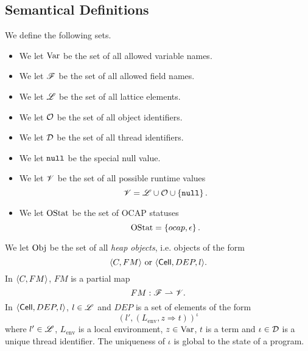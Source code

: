\subsection{Semantical Definitions}%
\label{sub:semantical_definitions}

\begin{definition}[Sets] We define the following sets.
  \begin{itemize}
    \item We let $\mathrm{Var}$ be the set of all allowed variable names.
    \item We let $\mathscr{F}$ be the set of all allowed field names.
    \item We let $\mbox{$\mathscr{L}$}$ be the set of all lattice elements.
    \item We let $\mathcal{O}$ be the set of all object identifiers.
    \item We let $\mathcal{D}$ be the set of all thread identifiers.
    \item We let $\mbox{\mdseries\texttt{null}}$ be the special null value.
    \item We let $\mathscr{V}$ be the set of all possible runtime values
      \begin{equation*}
        \mathscr{V} = \mbox{$\mathscr{L}$} \cup \mathcal{O} \cup \left\{ \mbox{\mdseries\texttt{null}} \right\}.
      \end{equation*}
    \item We let $\mathrm{OStat}$ be the set of OCAP statuses
      \begin{equation*}
        \mathrm{OStat} = \left\{ \mbox{$ocap$}, \mbox{$\epsilon$} \right\}.
      \end{equation*}
  \end{itemize}
\end{definition}

\begin{definition}\label{def:heap_obj}
  We let $\mathrm{Obj}$ be the set of all \emph{heap objects}, i.e. objects of the
  form
  \begin{equation*}
    \mbox{$\langle C, FM \rangle$} \text{ or } \mbox{$\langle \mbox{$\mathsf{Cell}$}{}, DEP, l \rangle$}.
  \end{equation*}
  In $\mbox{$\langle C, FM \rangle$}$, $FM$ is a partial map
  \begin{equation*}
    FM: \mathscr{F} \rightharpoonup \mathscr{V}.
  \end{equation*}
  In $\mbox{$\langle \mbox{$\mathsf{Cell}$}{}, DEP, l \rangle$}$, $l \in \mbox{$\mathscr{L}$}$ and $DEP$ is a set of elements of the
  form
  \begin{equation*}
    (l' , (L_{\text{env}}, z \Rightarrow t))^\iota
  \end{equation*}
  where $l' \in \mbox{$\mathscr{L}$}$, $L_{\text{env}}$ is a local environment, $z \in
  \mathrm{Var}$, $t$ is a term and $\iota \in \mathcal{D}$ is a unique thread identifier. The
  uniqueness of $\iota$ is global to the state of a program.
\end{definition}

